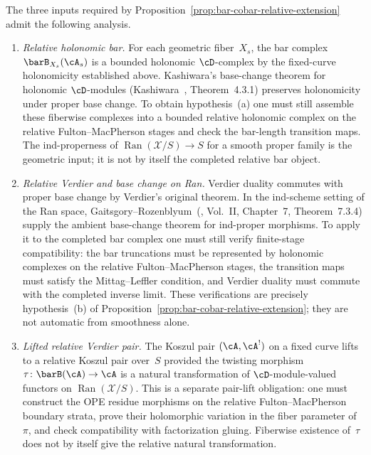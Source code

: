 \begin{remark}
\label{rem:relative-ran-analysis}
The three inputs required by
Proposition~\ref{prop:bar-cobar-relative-extension} admit the
following analysis.

\begin{enumerate}[label=\textup{(\alph*)}]
\item \emph{Relative holonomic bar.}
For each geometric fiber~$X_s$, the bar complex
$\barB_{X_s}(\cA_s)$ is a bounded holonomic $\cD$-complex by
the fixed-curve holonomicity established above. Kashiwara's
base-change theorem for holonomic $\cD$-modules
\textup{(}Kashiwara~\cite{Kas84}, Theorem~4.3.1\textup{)}
preserves holonomicity under proper base change. To obtain
hypothesis~\textup{(a)} one must still assemble these fiberwise
complexes into a bounded relative holonomic complex on the relative
Fulton--MacPherson stages and check the bar-length transition maps.
The ind-properness of
$\operatorname{Ran}(\mathcal{X}/S)\to S$ for a smooth proper family is
the geometric input; it is not by itself the completed relative bar
object.

\item \emph{Relative Verdier and base change on Ran.}
Verdier duality commutes with proper base change by Verdier's original
theorem. In the ind-scheme setting of the Ran space,
Gaitsgory--Rozenblyum~\textup{(}\cite{GR17},
Vol.~II, Chapter~7, Theorem~7.3.4\textup{)} supply the ambient
base-change theorem for ind-proper morphisms. To apply it to the
completed bar complex one must still verify finite-stage compatibility:
the bar truncations must be represented by holonomic complexes on the
relative Fulton--MacPherson stages, the transition maps must satisfy the
Mittag--Leffler condition, and Verdier duality must commute with the
completed inverse limit. These verifications are precisely
hypothesis~\textup{(b)} of
Proposition~\ref{prop:bar-cobar-relative-extension}; they are not
automatic from smoothness alone.

\item \emph{Lifted relative Verdier pair.}
The Koszul pair $(\cA, \cA^!)$ on a fixed curve lifts to a relative
Koszul pair over~$S$ provided the twisting morphism
$\tau \colon \barB(\cA) \to \cA$ is a natural transformation of
$\cD$-module-valued functors on
$\operatorname{Ran}(\mathcal{X}/S)$. This is a separate pair-lift
obligation: one must construct the OPE residue morphisms on the relative
Fulton--MacPherson boundary strata, prove their holomorphic variation in
the fiber parameter of~$\pi$, and check compatibility with factorization
gluing. Fiberwise existence of~$\tau$ does not by itself give the
relative natural transformation.
\end{enumerate}


\end{remark}
